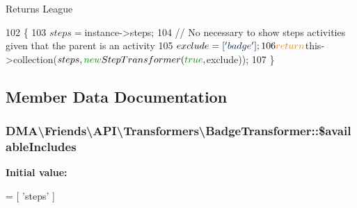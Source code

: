 \begin{DoxyReturn}{Returns}
League 
\end{DoxyReturn}

\begin{DoxyCode}
102     \{
103         $steps = $instance->steps;
104         \textcolor{comment}{// No necessary to show steps activities given that the parent is an activity}
105         $exclude = [\textcolor{stringliteral}{'badge'}];
106         \textcolor{keywordflow}{return} $this->collection($steps, \textcolor{keyword}{new} StepTransformer(\textcolor{keyword}{true}, $exclude));
107     \}
\end{DoxyCode}


\subsection{Member Data Documentation}
\hypertarget{classDMA_1_1Friends_1_1API_1_1Transformers_1_1BadgeTransformer_aa5844dd12d509abc5bbbde77a5050e0f}{}
\subsubsection[{\$available\+Includes}]{\setlength{\rightskip}{0pt plus 5cm}D\+M\+A\textbackslash{}\+Friends\textbackslash{}\+A\+P\+I\textbackslash{}\+Transformers\textbackslash{}\+Badge\+Transformer\+::\$available\+Includes\hspace{0.3cm}{\ttfamily [protected]}}\label{classDMA_1_1Friends_1_1API_1_1Transformers_1_1BadgeTransformer_aa5844dd12d509abc5bbbde77a5050e0f}
{\bfseries Initial value\+:}
\begin{DoxyCode}
= [
            \textcolor{stringliteral}{'steps'}
    ]
\end{DoxyCode}
\hypertarget{classDMA_1_1Friends_1_1API_1_1Transformers_1_1BadgeTransformer_a82e69be5fd5e311fb322efa0a9a5958c}{}
